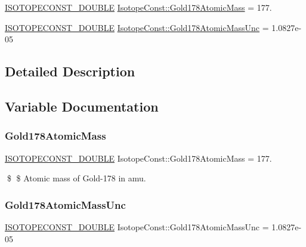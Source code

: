 \begin{DoxyCompactItemize}
\item 
\mbox{\hyperlink{group___isotope_const-_macros_ga8f45a7272ce02c0b4c65c44636ed719a}{I\+S\+O\+T\+O\+P\+E\+C\+O\+N\+S\+T\+\_\+\+D\+O\+U\+B\+LE}} \mbox{\hyperlink{group___isotope_const-_gold-_au178_gaa713dbb7cacd0dc14745dfd34a7b9a10}{Isotope\+Const\+::\+Gold178\+Atomic\+Mass}} = 177.
\item 
\mbox{\hyperlink{group___isotope_const-_macros_ga8f45a7272ce02c0b4c65c44636ed719a}{I\+S\+O\+T\+O\+P\+E\+C\+O\+N\+S\+T\+\_\+\+D\+O\+U\+B\+LE}} \mbox{\hyperlink{group___isotope_const-_gold-_au178_gae90fad86674011b5993d3bdbaa719db3}{Isotope\+Const\+::\+Gold178\+Atomic\+Mass\+Unc}} = 1.\+0827e-\/05
\end{DoxyCompactItemize}


\subsection{Detailed Description}


\subsection{Variable Documentation}
\mbox{\label{group___isotope_const-_gold-_au178_gaa713dbb7cacd0dc14745dfd34a7b9a10}} 
\subsubsection{\texorpdfstring{Gold178\+Atomic\+Mass}{Gold178AtomicMass}}
{\footnotesize\ttfamily \mbox{\hyperlink{group___isotope_const-_macros_ga8f45a7272ce02c0b4c65c44636ed719a}{I\+S\+O\+T\+O\+P\+E\+C\+O\+N\+S\+T\+\_\+\+D\+O\+U\+B\+LE}} Isotope\+Const\+::\+Gold178\+Atomic\+Mass = 177.}

\$ \$ Atomic mass of Gold-\/178 in amu. \mbox{\label{group___isotope_const-_gold-_au178_gae90fad86674011b5993d3bdbaa719db3}} 
\subsubsection{\texorpdfstring{Gold178\+Atomic\+Mass\+Unc}{Gold178AtomicMassUnc}}
{\footnotesize\ttfamily \mbox{\hyperlink{group___isotope_const-_macros_ga8f45a7272ce02c0b4c65c44636ed719a}{I\+S\+O\+T\+O\+P\+E\+C\+O\+N\+S\+T\+\_\+\+D\+O\+U\+B\+LE}} Isotope\+Const\+::\+Gold178\+Atomic\+Mass\+Unc = 1.\+0827e-\/05}

